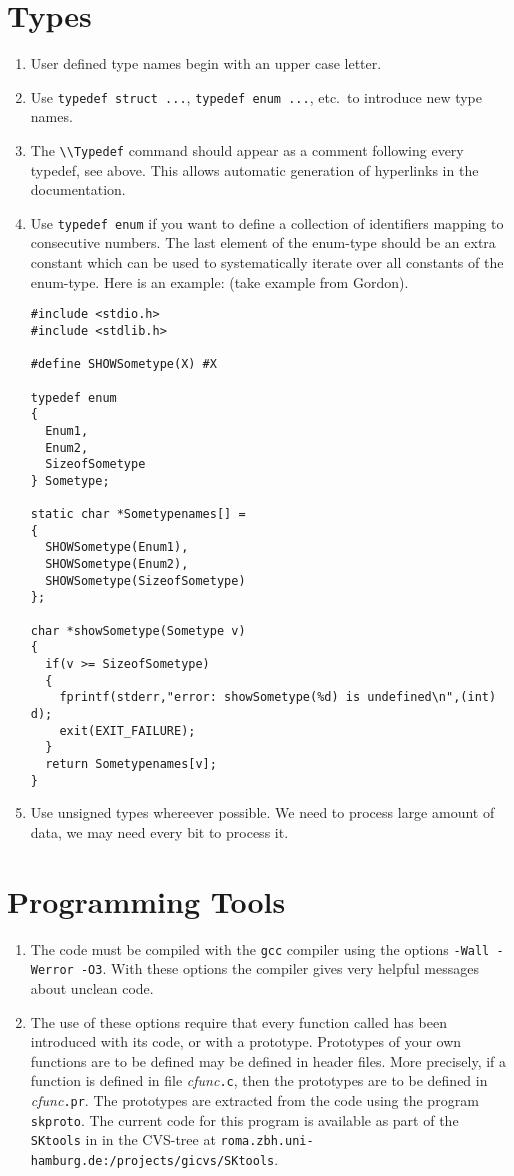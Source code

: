\documentclass[12pt]{article}
\begin{document}
\section{Types}
\begin{enumerate}
\item
User defined type names begin with an upper case letter.
\item
Use \texttt{typedef struct ...}, 
\texttt{typedef enum ...}, etc.\ to introduce
new type names.
\item
The \verb"\\Typedef" command should appear as a comment following every 
typedef, see above. This allows automatic generation of hyperlinks
in the documentation.
\item
Use \texttt{typedef enum} if you want to define a collection of identifiers
mapping to consecutive numbers. The last element of the enum-type should
be an extra constant which can be used to systematically iterate over
all constants of the enum-type. Here is an example: (take example
from Gordon).

\begin{verbatim}
#include <stdio.h>
#include <stdlib.h>

#define SHOWSometype(X) #X

typedef enum
{
  Enum1,
  Enum2,
  SizeofSometype
} Sometype;

static char *Sometypenames[] = 
{
  SHOWSometype(Enum1),
  SHOWSometype(Enum2),
  SHOWSometype(SizeofSometype)
};

char *showSometype(Sometype v)
{
  if(v >= SizeofSometype)
  {
    fprintf(stderr,"error: showSometype(%d) is undefined\n",(int) d);
    exit(EXIT_FAILURE);
  }
  return Sometypenames[v];
}
\end{verbatim}

\item
Use unsigned types whereever possible. We need to process large amount
of data, we may need every bit to process it.
\end{enumerate}

\section{Programming Tools}
\begin{enumerate}
\item
The code must be compiled with the \texttt{gcc} compiler
using the options \texttt{-Wall -Werror -O3}. With these options the
compiler gives very helpful messages about unclean code.
\item
The use of these options require that every function called has been 
introduced with its code, or with a prototype. Prototypes of your 
own functions are to be defined may be defined in header files. More
precisely, if a function is defined in file \emph{cfunc}\texttt{.c},
then the prototypes are to be defined in \emph{cfunc}\texttt{.pr}.
The prototypes are extracted from the code using the program 
\texttt{skproto}. The current code for this program is 
available as part of the \texttt{SKtools} in
in the CVS-tree at \texttt{roma.zbh.uni-hamburg.de:/projects/gicvs/SKtools}.
\end{enumerate}
\end{document}
